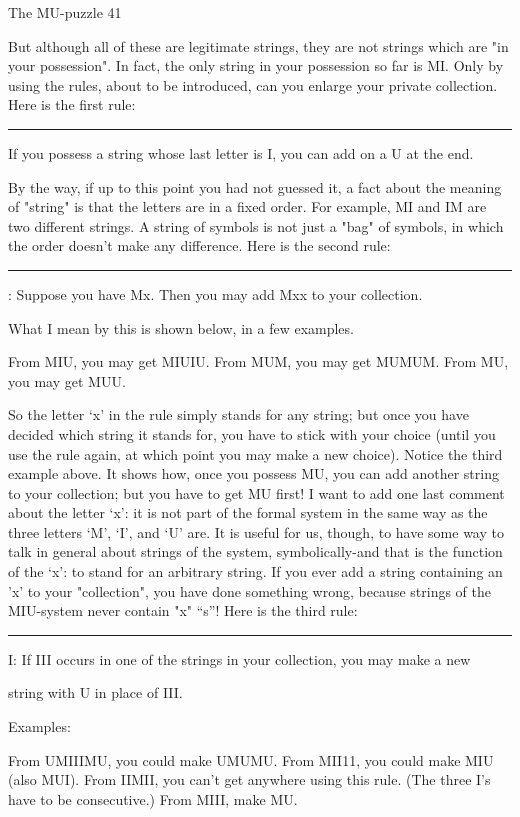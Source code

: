 The MU-puzzle                                                                                        41

But although all of these are legitimate strings, they are not strings which are "in your
possession". In fact, the only string in your possession so far is MI. Only by using the
rules, about to be introduced, can you enlarge your private collection. Here is the first
rule:

\rule I: If you possess a string whose last letter is I, you can add on a U at the end.\par


By the way, if up to this point you had not guessed it, a fact about the meaning of "string"
is that the letters are in a fixed order. For example, MI and IM are two different strings.
A string of symbols is not just a "bag" of symbols, in which the order doesn't make any
difference.
         Here is the second rule:

\rule II: Suppose you have Mx. Then you may add Mxx to your collection.\par


What I mean by this is shown below, in a few examples.

From MIU, you may get MIUIU.
From MUM, you may get MUMUM.
From MU, you may get MUU.

So the letter `x' in the rule simply stands for any string; but once you have decided which
string it stands for, you have to stick with your choice (until you use the rule again, at
which point you may make a new choice). Notice the third example above. It shows how,
once you possess MU, you can add another string to your collection; but you have to get
MU first! I want to add one last comment about the letter `x': it is not part of the formal
system in the same way as the three letters `M', `I', and `U' are. It is useful for us,
though, to have some way to talk in general about strings of the system, symbolically-and
that is the function of the `x': to stand for an arbitrary string. If you ever add a string
containing an 'x' to your "collection", you have done something wrong, because strings of
the MIU-system never contain "x" “s”!
Here is the third rule:

\rule III: If III occurs in one of the strings in your collection, you may make a new\par

string with U in place of III.

Examples:

     From UMIIIMU, you could make UMUMU.
     From MII11, you could make MIU (also MUI).
     From IIMII, you can't get anywhere using this rule.
       (The three I's have to be consecutive.)
     From MIII, make MU.

